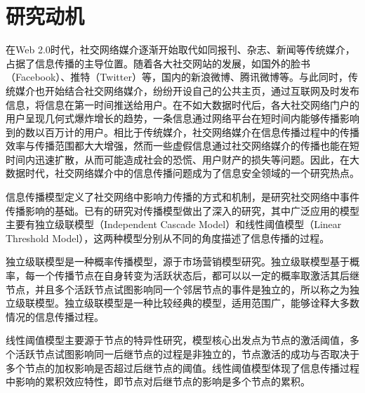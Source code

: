 \section{研究动机}
\label{sec5:motivation}
在Web 2.0时代，社交网络媒介逐渐开始取代如同报刊、杂志、新闻等传统媒介，占据了信息传播的主导位置。随着各大社交网站的发展，如国外的脸书（Facebook）、推特（Twitter）等，国内的新浪微博、腾讯微博等。与此同时，传统媒介也开始结合社交网络媒介，纷纷开设自己的公共主页，通过互联网及时发布信息，将信息在第一时间推送给用户。在不如大数据时代后，各大社交网络门户的用户呈现几何式爆炸增长的趋势，一条信息通过网络平台在短时间内能够传播影响到的数以百万计的用户。相比于传统媒介，社交网络媒介在信息传播过程中的传播效率与传播范围都大大增强，然而一些虚假信息通过社交网络媒介的传播也能在短时间内迅速扩散，从而可能造成社会的恐慌、用户财产的损失等问题。因此，在大数据时代，社交网络媒介中的信息传播问题成为了信息安全领域的一个研究热点。

信息传播模型定义了社交网络中影响力传播的方式和机制，是研究社交网络中事件传播影响的基础。已有的研究对传播模型做出了深入的研究，其中广泛应用的模型主要有独立级联模型（Independent Cascade Model）和线性阈值模型（Linear Threshold Model），这两种模型分别从不同的角度描述了信息传播的过程。

独立级联模型是一种概率传播模型，源于市场营销模型研究。独立级联模型基于概率，每一个传播节点在自身转变为活跃状态后，都可以以一定的概率取激活其后继节点，并且多个活跃节点试图影响同一个邻居节点的事件是独立的，所以称之为独立级联模型。独立级联模型是一种比较经典的模型，适用范围广，能够诠释大多数情况的信息传播过程。

线性阈值模型主要源于节点的特异性研究，模型核心出发点为节点的激活阈值，多个活跃节点试图影响同一后继节点的过程是非独立的，节点激活的成功与否取决于多个节点的加权影响是否超过后继节点的阈值。线性阈值模型体现了信息传播过程中影响的累积效应特性，即节点对后继节点的影响是多个节点的累积。

